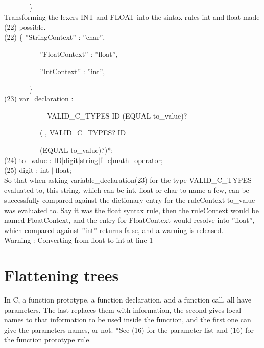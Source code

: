 \documentclass[twocolumn,10ptr]{article}
\begin{document}
	\ \ \ \ \ \ \    \}\\
	
	Transforming the lexers INT and FLOAT into the sintax rules int and float made (22) possible.\\
	
	(22)
	\{  ''StringContext'' : ''char'',
	
	\ \ \ \ \ \ \ \ \ \   ''FloatContext'' : ''float'',
	
	\ \ \ \ \ \ \ \ \ \   ''IntContext'' : ''int'',  
	
	\ \ \ \ \ \ \    \}\\
	
	
	(23) var\_declaration : 
	
	\ \ \ \ \ \ \ \ \ \ \ \  VALID\_C\_TYPES ID (EQUAL to\_value)?
	
	\ \ \ \ \ \ \ \ \ \    (\textsc{} ,\textsc{}  VALID\_C\_TYPES? ID 
	
	\ \ \ \ \ \ \ \ \ \   (EQUAL to\_value)?)*;\\
	(24) to\_value : ID\(\mid\)digit\(\mid\)string\(\mid\)f\_c\(\mid\)math\_operator;\\
	(25) digit : int \(\mid\) float;\\
	
	So that when asking variable\_declaration(23) for the type VALID\_C\_TYPES evaluated to, this string, which can be \textsc{}int\textsc{}, \textsc{}float\textsc{} or \textsc{}char\textsc{} to name a few, can be successfully compared against the dictionary entry for the ruleContext to\_value was evaluated to. Say it was the float syntax rule, then the ruleContext would be named FloatContext, and the entry for FloatContext would resolve into  ''float'', which compared against  ''int'' returns false, and a warning is released.\\
	
	Warning : Converting from float to int at line 1\\
	
	
	
	
	\section{Flattening trees}
	In C, a function prototype, a function declaration, and a function call, all have parameters. The last replaces them with information, the second gives local names to that information to be used inside the function, and the first one can give the parameters names, or not. *See (16) for the parameter list and (16) for the function prototype rule.
	
\end{document}
